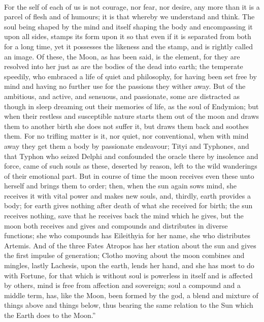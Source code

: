 \documentclass[a4paper, 11pt, oneside, polutonikogreek, english]{article}
\begin{document}
\paragraph{}
For the self of each of us is not courage, nor fear, nor desire, any more than it is a parcel of flesh and of humours; it is that whereby we understand and think. The soul being shaped by the mind and itself shaping the body and encompassing it upon all sides, stamps its form upon it so that even if it is separated from both for a long time, yet it possesses the likeness and the stamp, and is rightly called an image. Of these, the Moon, as has been said, is the element, for they are resolved into her just as are the bodies of the dead into earth; the temperate speedily, who embraced a life of quiet and philosophy, for having been set free by mind and having no further use for the passions they wither away. But of the ambitious, and active, and sensuous, and passionate, some are distracted as though in sleep dreaming out their memories of life, as the soul of Endymion; but when their restless and susceptible nature starts them out of the moon and draws them to another birth she does not suffer it, but draws them back and soothes them. For no trifling matter is it, nor quiet, nor conventional, when with mind away they get them a body by passionate endeavour; Tityi and Typhones, and that Typhon who seized Delphi and confounded the oracle there by insolence and force, came of such souls as these, deserted by reason, left to the wild wanderings of their emotional part. But in course of time the moon receives even these unto herself and brings them to order; then, when the sun again sows mind, she receives it with vital power and makes new souls, and, thirdly, earth provides a body; for earth gives nothing after death of what she received for birth; the sun receives nothing, save that he receives back the mind which he gives, but the moon both receives and gives and compounds and distributes in diverse functions; she who compounds has Eileithyia for her name, she who distributes Artemis. And of the three Fates Atropos has her station about the sun and gives the first impulse of generation; Clotho moving about the moon combines and mingles, lastly Lachesis, upon the earth, lends her hand, and she has most to do with Fortune, for that which is without soul is powerless in itself and is affected by others, mind is free from affection and sovereign; soul a compound and a middle term, has, like the Moon, been formed by the god, a blend and mixture of things above and things below, thus bearing the same relation to the Sun which the Earth does to the Moon.''
\end{document}
